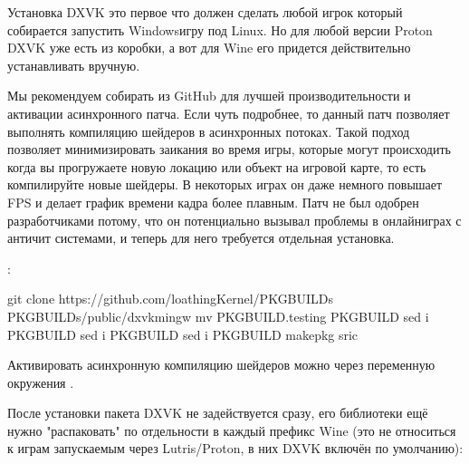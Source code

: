 \documentclass[letterpaper,10pt,russian,openany]{sphinxmanual}
\begin{document}
\sphinxAtStartPar
Установка DXVK \sphinxhyphen{} это первое что должен сделать любой игрок который собирается запустить Windows\sphinxhyphen{}игру под Linux.
Но для любой версии Proton DXVK уже есть из коробки, а вот для Wine его придется действительно устанавливать вручную.

\sphinxAtStartPar
Мы рекомендуем собирать 
из GitHub для лучшей производительности и активации асинхронного патча. Если чуть подробнее,
то данный патч позволяет выполнять компиляцию шейдеров в асинхронных потоках.
Такой подход позволяет минимизировать заикания во время игры, которые могут происходить когда вы прогружаете новую локацию или объект на игровой карте,
то есть компилируйте новые шейдеры. В некоторых играх он даже немного повышает FPS и делает график времени кадра более плавным.
Патч не был одобрен разработчиками потому, что он потенциально вызывал проблемы в онлайн\sphinxhyphen{}играх с анти\sphinxhyphen{}чит системами, и теперь
для него требуется отдельная установка.

\sphinxAtStartPar
{}:

\begin{sphinxVerbatim}[commandchars=\\\{\}]
git clone https://github.com/loathingKernel/PKGBUILDs
 PKGBUILDs/public/dxvk\PYGZhy{}mingw
mv PKGBUILD.testing PKGBUILD
sed \PYGZhy{}i  PKGBUILD
sed \PYGZhy{}i  PKGBUILD
sed \PYGZhy{}i  PKGBUILD 
makepkg \PYGZhy{}sric 
\end{sphinxVerbatim}

\sphinxAtStartPar
Активировать асинхронную компиляцию шейдеров можно через переменную окружения .

\sphinxAtStartPar
После установки пакета DXVK не задействуется сразу, его библиотеки ещё нужно "распаковать" по отдельности в каждый префикс Wine
(это не относиться к играм запускаемым через Lutris/Proton, в них DXVK включён по умолчанию):
\end{document}
